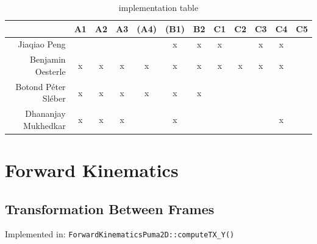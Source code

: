 \documentclass[a4paper,10pt]{article}
\begin{document}
\begin{table}[h!]
  \begin{center}
    \begin{tabular}{rccccccccccc}
               ~          & \textbf{A1} & \textbf{A2} & \textbf{A3} & \textbf{(A4)} & \textbf{(B1)} & \textbf{B2} & \textbf{C1} & \textbf{C2} & \textbf{C3} & \textbf{C4} & \textbf{C5}\\\hline
      Jiaqiao Peng        &      ~      &      ~      &      ~      &       ~       &       x       &      x      &      x      &      ~      &      x      &      x      &      ~     \\\hline
      Benjamin Oesterle   &      x      &      x      &      x      &       x       &       x       &      x      &      x      &      x      &      x      &      x      &      ~     \\\hline
      Botond Péter Sléber &      x      &      x      &      x      &       x       &       x       &      x      &      ~      &      ~      &      ~      &      ~      &      ~     \\\hline
      Dhananjay Mukhedkar &      x      &      x      &      x      &       ~       &       x       &      ~      &      ~      &      ~      &      ~      &      x      &      ~     \\\hline
      
    \end{tabular}
    \caption{implementation table}
  \end{center}
\end{table}

\newpage


\section{Forward Kinematics}

\subsection{Transformation Between Frames}

\vspace{-6mm}Implemented in: \texttt{ForwardKinematicsPuma2D::computeTX\_Y()}
\end{document}
